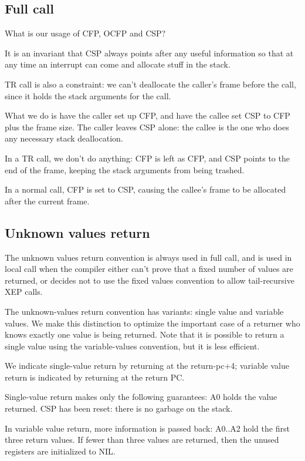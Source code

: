 
\subsection{Full call}

What is our usage of CFP, OCFP and CSP?  

It is an invariant that CSP always points after any useful information so that
at any time an interrupt can come and allocate stuff in the stack.

TR call is also a constraint: we can't deallocate the caller's frame before the
call, since it holds the stack arguments for the call.  

What we do is have the caller set up CFP, and have the callee set CSP to CFP
plus the frame size.  The caller leaves CSP alone: the callee is the one who
does any necessary stack deallocation.

In a TR call, we don't do anything: CFP is left as CFP, and CSP points to the
end of the frame, keeping the stack arguments from being trashed.

In a normal call, CFP is set to CSP, causing the callee's frame to be allocated
after the current frame.


\subsection{Unknown values return}

The unknown values return convention is always used in full call, and is used
in local call when the compiler either can't prove that a fixed number of
values are returned, or decides not to use the fixed values convention to allow
tail-recursive XEP calls.

The unknown-values return convention has variants: single value and variable
values.  We make this distinction to optimize the important case of a returner
who knows exactly one value is being returned.  Note that it is possible to
return a single value using the variable-values convention, but it is less
efficient.

We indicate single-value return by returning at the return-pc+4; variable value
return is indicated by returning at the return PC.

Single-value return makes only the following guarantees:
    A0 holds the value returned.
    CSP has been reset: there is no garbage on the stack.

In variable value return, more information is passed back:
    A0..A2 hold the first three return values.  If fewer than three values are
    returned, then the unused registers are initialized to NIL.

